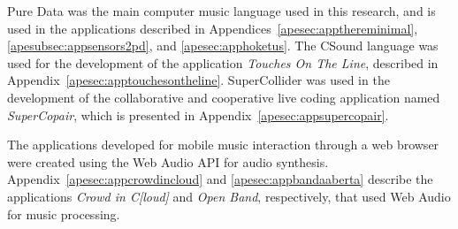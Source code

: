 
Pure Data was the main computer music language used in this research, and is used in the applications described in Appendices~\ref{apesec:appthereminimal}, \ref{apesubsec:appsensors2pd}, and \ref{apesec:apphoketus}.
The CSound language was used for the development of the application \textit{Touches On The Line}, described in Appendix~\ref{apesec:apptouchesontheline}.
SuperCollider was used in the development of the collaborative and cooperative live coding application named \textit{SuperCopair}, which is presented in Appendix~\ref{apesec:appsupercopair}.

The applications developed for mobile music interaction through a web browser were created using the Web Audio API for audio synthesis.
Appendix~\ref{apesec:appcrowdincloud} and \ref{apesec:appbandaaberta} describe the applications \textit{Crowd in C[loud]} and \textit{Open Band}, respectively, that used Web Audio for music processing.

